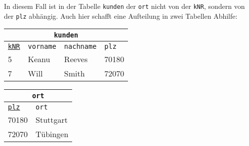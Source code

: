 In diesem Fall ist in der Tabelle \lstinline!kunden! der \lstinline!ort! nicht von der \lstinline!kNR!, sondern von der \lstinline!plz! abhängig. Auch hier schafft eine Aufteilung in zwei Tabellen Abhilfe:
\begin{minipage}{\textwidth}
	\begin{minipage}{0.66\textwidth}
		\begin{tabular}{llll}
			\multicolumn{4}{c}{\lstinline!kunden!}\\
			\hline
			\underline{\lstinline!kNR!}&\lstinline!vorname!&\lstinline!nachname!&\lstinline!plz!\\
			\hline
			5&Keanu&Reeves&70180\\
			7&Will&Smith&72070\\
		\end{tabular}
	\end{minipage}
	\begin{minipage}{0.33\textwidth}
		\begin{tabular}{ll}
			\multicolumn{2}{c}{\lstinline!ort!}\\
			\hline
			\underline{\lstinline!plz!}&\lstinline!ort!\\
			\hline
			70180&Stuttgart\\
			72070&Tübingen\\
		\end{tabular}
	\end{minipage}
\end{minipage}

